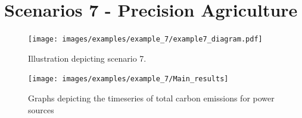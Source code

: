 \documentclass{l4proj}
\begin{document}
\section{Scenarios 7 - Precision Agriculture}\label{eval:subsec:scenario 7}
\begin{figure}[h]
    \centering
    \texttt{[image: images/examples/example\_7/example7\_diagram.pdf]}
    ~
    \caption{Illustration depicting scenario 7.}
    \label{fig:example7_diagram}
\end{figure}
\begin{figure}[h]
    \centering
    \texttt{[image: images/examples/example\_7/Main\_results]}
    ~
    \caption{Graphs depicting the timeseries of total carbon emissions for power sources}
    \label{fig:example7_final_results}
\end{figure}

%
%
%

\end{document}
